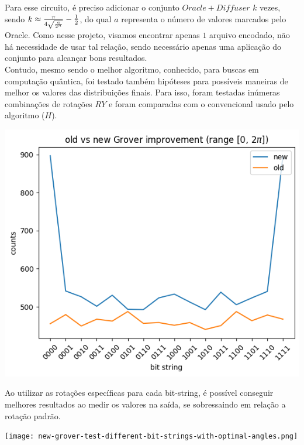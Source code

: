 \documentclass{article}
\begin{document}
Para esse circuito, é preciso adicionar o conjunto $Oracle + Diffuser$ $k$ vezes, sendo $k \approx { {\pi \over {4 \sqrt{a\over{2^n}}}} - {1\over2}  }$, do qual $a$ representa o número de valores marcados pelo Oracle. Como nesse projeto, visamos encontrar apenas $1$ arquivo encodado, não há necessidade de usar tal relação, sendo necessário apenas uma aplicação do conjunto para alcançar bons resultados.\\
Contudo, mesmo sendo o melhor algoritmo, conhecido, para buscas em computação quântica, foi testado também hipóteses para possíveis maneiras de melhor os valores das distribuições finais. Para isso, foram testadas inúmeras combinações de rotações $RY$ e foram comparadas com o convencional usado pelo algoritmo ($H$).

\begin{center}
	\includegraphics[scale=0.5]{improvement-grover-algorithm-4bits-0-to-2pi.png}
	\label{fig:best-angle-grover}
\end{center}

Ao utilizar as rotações específicas para cada bit-string, é possível conseguir melhores resultados ao medir os valores na saída, se sobressaindo em relação a rotação padrão.

\begin{center}
	\texttt{[image: new-grover-test-different-bit-strings-with-optimal-angles.png]}
	\label{fig:best-angles-diff-bit-strings-grover}
\end{center}
\end{document}
